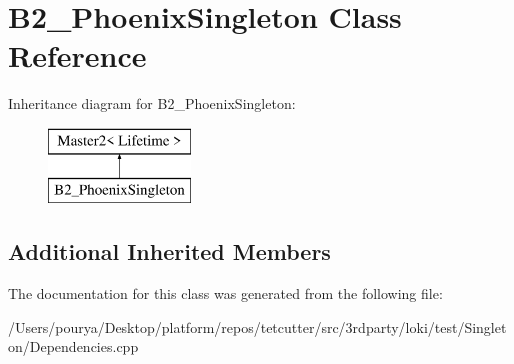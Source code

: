 \hypertarget{classB2__PhoenixSingleton}{}\section{B2\+\_\+\+Phoenix\+Singleton Class Reference}
\label{classB2__PhoenixSingleton}
Inheritance diagram for B2\+\_\+\+Phoenix\+Singleton\+:\begin{figure}[H]
\begin{center}
\leavevmode
\includegraphics[height=2.000000cm]{classB2__PhoenixSingleton}
\end{center}
\end{figure}
\subsection*{Additional Inherited Members}


The documentation for this class was generated from the following file\+:\begin{DoxyCompactItemize}
\item 
/\+Users/pourya/\+Desktop/platform/repos/tetcutter/src/3rdparty/loki/test/\+Singleton/Dependencies.\+cpp\end{DoxyCompactItemize}
